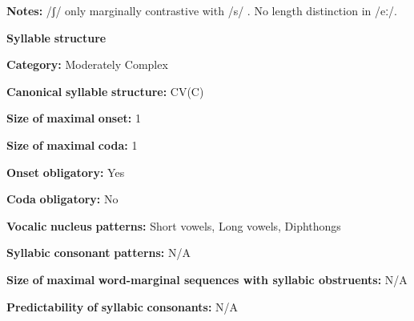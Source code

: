 \begin{styleBody}
\textbf{Notes:} /ʃ/ only marginally contrastive with /s/ \citep[17]{Bright1957}. No length distinction in /eː/.
\end{styleBody}

\begin{styleBody}
\textbf{Syllable} \textbf{structure}
\end{styleBody}

\begin{styleBody}
\textbf{Category:} Moderately Complex
\end{styleBody}

\begin{styleBody}
\textbf{Canonical} \textbf{syllable} \textbf{structure:} CV(C) \citep[11]{Bright1957}
\end{styleBody}

\begin{styleBody}
\textbf{Size} \textbf{of} \textbf{maximal} \textbf{onset:} 1
\end{styleBody}

\begin{styleBody}
\textbf{Size} \textbf{of} \textbf{maximal} \textbf{coda:} 1
\end{styleBody}

\begin{styleBody}
\textbf{Onset} \textbf{obligatory:} Yes
\end{styleBody}

\begin{styleBody}
\textbf{Coda} \textbf{obligatory:} No
\end{styleBody}

\begin{styleBody}
\textbf{Vocalic} \textbf{nucleus} \textbf{patterns:} Short vowels, Long vowels, Diphthongs
\end{styleBody}

\begin{styleBody}
\textbf{Syllabic} \textbf{consonant} \textbf{patterns:} N/A
\end{styleBody}

\begin{styleBody}
\textbf{Size} \textbf{of} \textbf{maximal} \textbf{word{}-marginal sequences with syllabic obstruents:} N/A
\end{styleBody}

\begin{styleBody}
\textbf{Predictability} \textbf{of} \textbf{syllabic} \textbf{consonants:} N/A
\end{styleBody}

